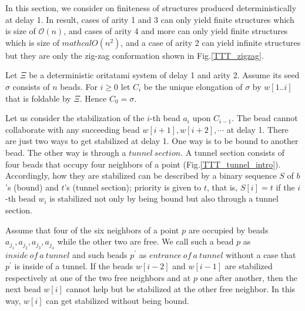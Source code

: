 \documentclass[runningheads]{llncs}
\begin{document}
In this section, we consider on finiteness of structures produced deterministically at delay 1. In result, cases of arity 1 and 3 can only yield finite structures which is size of $\mathcal{O} (n)$, and cases of arity 4 and more can only yield finite structures which is size of $mathcal{O} (n^2)$, and a case of arity 2 can yield infinite structures but they are only the zig-zag conformation shown in Fig.\ref{TTT_zigzag}. 



Let $\Xi$ be a deterministic oritatami system of delay 1 and arity 2. Assume its seed $\sigma$ consists of $n$ beads.
For $i \geq 0$ let $C_i$ be the unique elongation of $\sigma$ by $w[1..i]$ that is foldable by $\Xi$. Hence $C_0 = \sigma$.


Let us consider the stabilization of the $i$-th bead $a_i$ upon $C_{i-1}$. The bead cannot collaborate with any succeeding bead $w[i+1],w[i+2],\cdots$ at delay 1. There are just two ways to get stabilized at delay 1. One way is to be bound to another bead. The other way is through a $tunnel\ section$. A tunnel section consists of four beads that occupy four neighbors of a point (Fig.\ref{TTT_tunnel_intro}). 
Accordingly, how they are stabilized can be described by a binary sequence $S$ of $b$'s (bound) and $t$'s (tunnel section); priority is given to $t$, that is, $S[i] = t$ if the $i$-th bead $w_i$ is stabilized not only by being bound but also through a tunnel section. 

Assume that four of the six neighbors of a point $p$ are occupied by beads $a_{j_1},a_{j_2},a_{j_3},a_{j_4}$ while the other two are free. We call such a bead $p$ as $inside\ of\ a\ tunnel$ and such beads $p^\prime$ as $entrance\ of\ a\ tunnel$ without a case that $p^\prime$ is inside of a tunnel. If the beads $w[i-2]$ and $w[i-1]$ are stabilized respectively at one of the two free neighbors and at $p$ one after another, then the next bead $w[i]$ cannot help but be stabilized at the other free neighbor. In this way, $w[i]$ can get stabilized without being bound.

\end{document}
